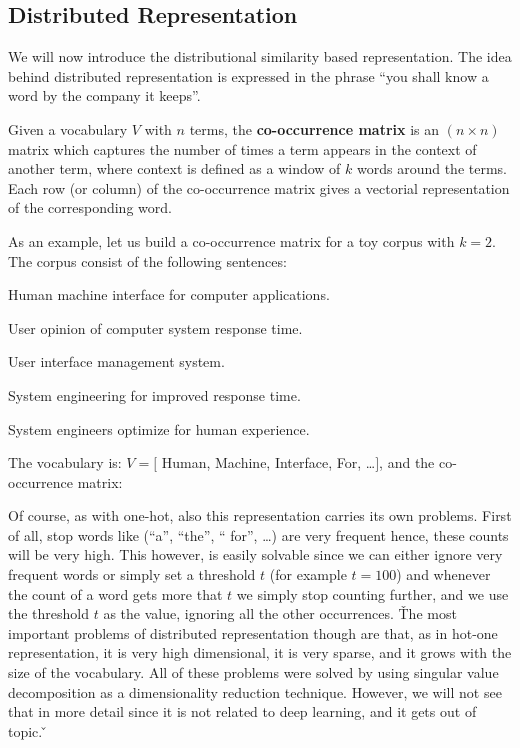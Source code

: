 \subsection{Distributed Representation}

We will now introduce the distributional similarity based representation. The idea behind distributed representation
is expressed in the phrase ``you shall know a word by the company it keeps''.

Given a vocabulary $V$ with $n$ terms, the \textbf{co-occurrence matrix} is an $(n \times n)$ matrix which captures
the number of times a term appears in the context of another term, where context is defined as a window of $k$ words
around the terms. Each row (or column) of the co-occurrence matrix gives a vectorial representation of the
corresponding word.
\ed

\be
As an example, let us build a co-occurrence matrix for a toy corpus with $k = 2$. The corpus consist of the following
sentences:
\bit
\item Human machine interface for computer applications.
\item User opinion of computer system response time.
\item User interface management system.
\item System engineering for improved response time.
\item System engineers optimize for human experience.
\eit

The vocabulary is: $V = [$ Human, Machine, Interface, For, \ldots $]$, and the co-occurrence matrix:

\ee

Of course, as with one-hot, also this representation carries its own problems. First of all, stop words like (``a'',
``the'', `` for'', \ldots) are very frequent hence, these counts will be very high. This however, is easily solvable
since we can either ignore very frequent words or simply set a threshold $t$ (for example $t=100$) and whenever the
count of a word gets more that $t$ we simply stop counting further, and we use the threshold $t$ as the value,
ignoring all the other occurrences. \v

The most important problems of distributed representation though are that, as in hot-one representation, it is very
high dimensional, it is very sparse, and it grows with the size of the vocabulary. All of these problems were solved
by using singular value decomposition as a dimensionality reduction technique. However, we will not see that in more
detail since it is not related to deep learning, and it gets out of topic. \v

